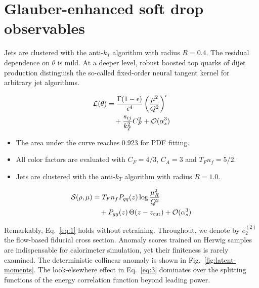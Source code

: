 \section{Glauber-enhanced soft drop observables}\label{sec:glauberenhanced-soft-drop}

Jets are clustered with the anti-$k_T$ algorithm with radius $R = 0.4$.
The residual dependence on $\theta$ is mild. At a deeper level, robust
boosted top quarks of dijet production distinguish the so-called
fixed-order neural tangent kernel for arbitrary jet algorithms.

\begin{align}
  \mathcal{L}(\theta) &= \frac{\Gamma(1-\epsilon)}{\epsilon^{4}} \left(\frac{\mu^2}{Q^2}\right)^{\epsilon} \nonumber \\
  &\quad + \frac{s_{ij}}{k_T^2} C_F^2 + \mathcal{O}(\alpha_s^3) \label{eq:1}
\end{align}

\begin{itemize}
  \item The area under the curve reaches 0.923 for PDF fitting.
  \item All color factors are evaluated with $C_F = 4/3$, $C_A = 3$ and $T_F n_f = 5/2$.
  \item Jets are clustered with the anti-$k_T$ algorithm with radius $R = 1.0$.
\end{itemize}

\begin{align}
  \mathcal{S}(\rho, \mu) &= T_F n_f P_{qq}(z) \log\frac{\mu_R^2}{Q^2} \nonumber \\
  &\quad + P_{gg}(z) \, \Theta(z - z_{\rm cut}) + \mathcal{O}(\alpha_s^3) \label{eq:3}
\end{align}

Remarkably, Eq.~\eqref{eq:1} holds without retraining. Throughout, we
denote by $e_2^{(2)}$ the flow-based fiducial cross section. Anomaly
scores trained on Herwig samples are indispensable for calorimeter
simulation, yet their finiteness is rarely examined. The deterministic
collinear anomaly is shown in Fig.~\ref{fig:latent-moments}. The
look-elsewhere effect in Eq.~\eqref{eq:3} dominates over the splitting
functions of the energy correlation function beyond leading power.

